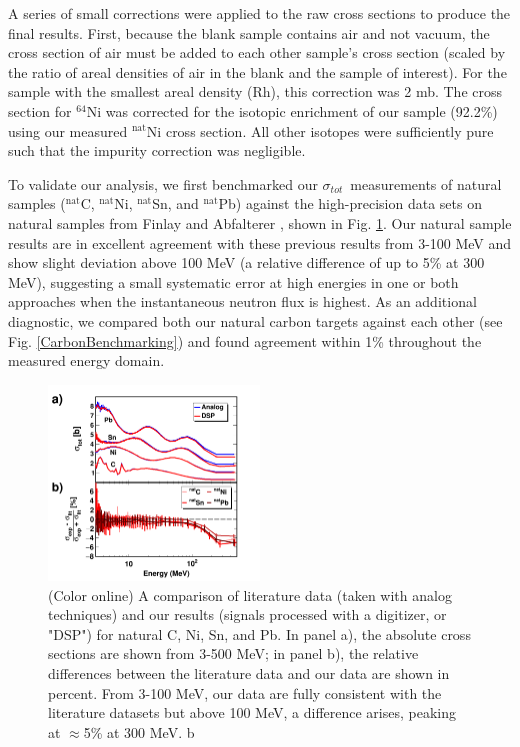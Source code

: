 \documentclass[twocolumn,secnumarabic,amssymb, nobibnotes, aps, prl,
superscriptaddress, nobalancelastpage]{revtex4}
\newcommand{\tot}{\ensuremath{\sigma_{tot}}}
\begin{document}
A series of small corrections were applied to the raw cross sections to produce
the final results. First, because the blank sample contains air and not vacuum,
the cross section of air must be added to each other sample's cross section (scaled by  
the ratio of areal densities of air in the blank and the sample of interest).
For the sample with the smallest areal density (Rh), this correction was 2 mb.
The cross section for $^{64}$Ni was corrected for the isotopic enrichment of our
sample (92.2\%) using our measured $^{\text{nat}}$Ni cross section. All other isotopes were 
sufficiently pure such that the impurity correction was negligible.

To validate our analysis, we first benchmarked our \tot\ measurements of natural samples
($^{\text{nat}}$C, $^{\text{nat}}$Ni, $^{\text{nat}}$Sn, and
$^{\text{nat}}$Pb) against the high-precision data sets on natural samples from Finlay
\cite{Finlay1993} and Abfalterer \cite{Abfalterer2001}, shown in Fig.
\ref{LiteratureBenchmarking}. Our natural sample results
are in excellent agreement with 
these previous results from 3-100 MeV and show slight deviation above 100 MeV (a
relative difference of up to 5\% at 300 MeV), suggesting a small systematic
error at high energies in one or both approaches when the instantaneous neutron
flux is highest. As an additional diagnostic, we compared 
both our natural carbon targets against each other (see Fig.
\ref{CarbonBenchmarking}) and found agreement within 1\% throughout the measured
energy domain.

\begin{figure}
    \includegraphics[width=0.5\textwidth]{figures/literatureBenchmarking.png}
    \caption{(Color online) A comparison of literature data (taken with analog
    techniques) and our results (signals processed with a digitizer, or "DSP")
    for natural C, Ni, Sn, and Pb. In panel a), the absolute cross sections are shown from
    3-500 MeV; in panel b), the relative differences between the literature data and
    our data are shown in percent. From 3-100 MeV, our data are fully consistent with the
    literature datasets but above 100 MeV, a difference arises, peaking at
    $\approx$5\% at 300 MeV.
b}
    \label{LiteratureBenchmarking}
\end{figure}
\end{document}
